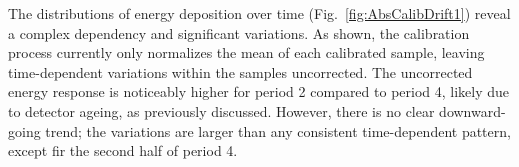 The distributions of energy deposition over time (Fig.~\ref{fig:AbsCalibDrift1}) reveal a complex dependency and significant variations. As shown, the calibration process currently only normalizes the mean of each calibrated sample, leaving time-dependent variations within the samples uncorrected. The uncorrected energy response is noticeably higher for period 2 compared to period 4, likely due to detector ageing, as previously discussed. However, there is no clear downward-going trend; the variations are larger than any consistent time-dependent pattern, except fir the second half of period 4.

